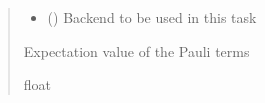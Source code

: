 \documentclass[letterpaper,10pt,english]{sphinxmanual}
\begin{document}
\begin{fulllineitems}
\begin{fulllineitems}
\begin{quote}
\begin{description}
\begin{itemize}
\item {} 
\sphinxAtStartPar
{} () \textendash{} Backend to be used in this task

\end{itemize}

\sphinxAtStartPar
Expectation value of the Pauli terms

\sphinxAtStartPar
float

\end{description}\end{quote}

\end{fulllineitems}


\end{fulllineitems}

\end{document}
